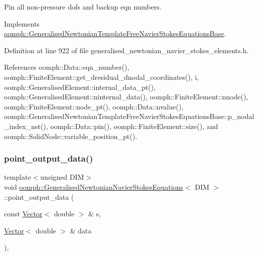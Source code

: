 Pin all non-\/pressure dofs and backup eqn numbers. 



Implements \hyperlink{classoomph_1_1GeneralisedNewtonianTemplateFreeNavierStokesEquationsBase_ae5b2fd78047630a2be4d66c541184a46}{oomph\+::\+Generalised\+Newtonian\+Template\+Free\+Navier\+Stokes\+Equations\+Base}.



Definition at line 922 of file generalised\+\_\+newtonian\+\_\+navier\+\_\+stokes\+\_\+elements.\+h.



References oomph\+::\+Data\+::eqn\+\_\+number(), oomph\+::\+Finite\+Element\+::get\+\_\+dresidual\+\_\+dnodal\+\_\+coordinates(), i, oomph\+::\+Generalised\+Element\+::internal\+\_\+data\+\_\+pt(), oomph\+::\+Generalised\+Element\+::ninternal\+\_\+data(), oomph\+::\+Finite\+Element\+::nnode(), oomph\+::\+Finite\+Element\+::node\+\_\+pt(), oomph\+::\+Data\+::nvalue(), oomph\+::\+Generalised\+Newtonian\+Template\+Free\+Navier\+Stokes\+Equations\+Base\+::p\+\_\+nodal\+\_\+index\+\_\+nst(), oomph\+::\+Data\+::pin(), oomph\+::\+Finite\+Element\+::size(), and oomph\+::\+Solid\+Node\+::variable\+\_\+position\+\_\+pt().

\mbox{\label{classoomph_1_1GeneralisedNewtonianNavierStokesEquations_a85cfe5eddc8339b7788100f00769ee46}} 
\subsubsection{\texorpdfstring{point\+\_\+output\+\_\+data()}{point\_output\_data()}}
{\footnotesize\ttfamily template$<$unsigned D\+IM$>$ \\
void \hyperlink{classoomph_1_1GeneralisedNewtonianNavierStokesEquations}{oomph\+::\+Generalised\+Newtonian\+Navier\+Stokes\+Equations}$<$ D\+IM $>$\+::point\+\_\+output\+\_\+data (\begin{DoxyParamCaption}\item[{const \hyperlink{classoomph_1_1Vector}{Vector}$<$ double $>$ \&}]{s,  }\item[{\hyperlink{classoomph_1_1Vector}{Vector}$<$ double $>$ \&}]{data }\end{DoxyParamCaption})\hspace{0.3cm}{\ttfamily [inline]}, {\ttfamily [virtual]}}



